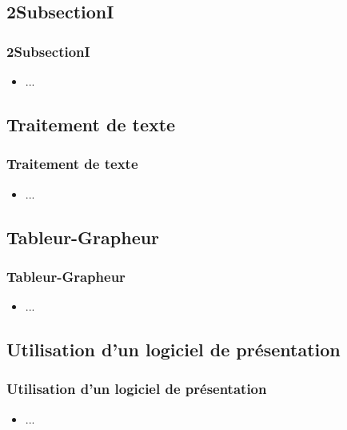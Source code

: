 \documentclass{beamer}
\begin{document}
\subsection{ \titleSection2SubsectionI }
\begin{frame}
	\frametitle{ \titleSection2SubsectionI }
	\begin{itemize}
		\item ... 
	\end{itemize}
\end{frame}

\def\titleSection2Subsection2{Traitement de texte}
\subsection{ \titleSection2Subsection2 }
\begin{frame}
	\frametitle{ \titleSection2Subsection2 }
	\begin{itemize}
		\item ... 
	\end{itemize}
\end{frame}

\def\titleSection2Subsection3{Tableur-Grapheur}
\subsection{ \titleSection2Subsection3 }
\begin{frame}
	\frametitle{ \titleSection2Subsection3 }
	\begin{itemize}
		\item ... 
	\end{itemize}
\end{frame}

\def\titleSection2Subsection4{Utilisation d'un logiciel de pr{\'e}sentation}
\subsection{ \titleSection2Subsection4 }
\begin{frame}
	\frametitle{ \titleSection2Subsection4 }
	\begin{itemize}
		\item ... 
	\end{itemize}
\end{frame}


\def\titleSection3{Acquisition de donn{\'e}es et gestion de proc{\'e}d{\'e}s}
\end{document}
